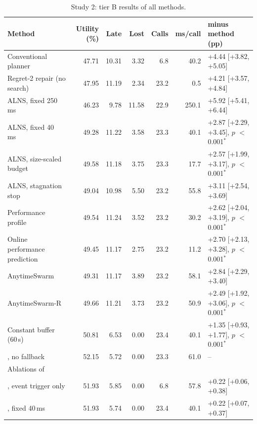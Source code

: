 \begin{table}[t]
\caption{Study 2: tier B results of all methods.}\label{tab:s2main}
\centering\small
\setlength{\tabcolsep}{3pt}
\begin{threeparttable}
\begin{tabular}{lrrrrrl}
\toprule
Method & Utility (\%) & Late & Lost & Calls & ms/call & \mname{} minus method (pp) \\
\midrule
Conventional planner & 47.71 & 10.31 & 3.32 & 6.8 & 40.2 & +4.44 [+3.82, +5.05] \\
Regret-2 repair (no search) & 47.95 & 11.19 & 2.34 & 23.2 & 0.5 & +4.21 [+3.57, +4.84] \\
ALNS, fixed 250 ms~\cite{ropke2006adaptive} & 46.23 & 9.78 & 11.58 & 22.9 & 250.1 & +5.92 [+5.41, +6.44] \\
ALNS, fixed 40 ms~\cite{ropke2006adaptive} & 49.28 & 11.22 & 3.58 & 23.3 & 40.1 & +2.87 [+2.29, +3.45], $p$ $<$0.001$^{\ast}$ \\
ALNS, size-scaled budget & 49.58 & 11.18 & 3.75 & 23.3 & 17.7 & +2.57 [+1.99, +3.17], $p$ $<$0.001$^{\ast}$ \\
ALNS, stagnation stop & 49.04 & 10.98 & 5.50 & 23.2 & 55.8 & +3.11 [+2.54, +3.69] \\
Performance profile~\cite{boddy1994deliberation,zilberstein1996using} & 49.54 & 11.24 & 3.52 & 23.2 & 30.2 & +2.62 [+2.04, +3.19], $p$ $<$0.001$^{\ast}$ \\
Online performance prediction~\cite{svegliato2018meta} & 49.45 & 11.17 & 2.75 & 23.2 & 11.2 & +2.70 [+2.13, +3.28], $p$ $<$0.001$^{\ast}$ \\
AnytimeSwarm & 49.31 & 11.17 & 3.89 & 23.2 & 58.1 & +2.84 [+2.29, +3.40] \\
AnytimeSwarm-R & 49.66 & 11.21 & 3.73 & 23.2 & 50.9 & +2.49 [+1.92, +3.06], $p$ $<$0.001$^{\ast}$ \\
Constant buffer (60\,s)~\cite{jabali2015selfimposed} & 50.81 & 6.53 & 0.00 & 23.4 & 40.1 & +1.35 [+0.93, +1.77], $p$ $<$0.001$^{\ast}$ \\
\mname{}, no fallback & 52.15 & 5.72 & 0.00 & 23.3 & 61.0 & -- \\
\midrule
\multicolumn{7}{l}{Ablations of \mname{}} \\
\mname{}, event trigger only & 51.93 & 5.85 & 0.00 & 6.8 & 57.8 & +0.22 [+0.06, +0.38] \\
\mname{}, fixed 40\,ms & 51.93 & 5.74 & 0.00 & 23.4 & 40.1 & +0.22 [+0.07, +0.37] \\

\end{tabular}
\end{threeparttable}
\end{table}
